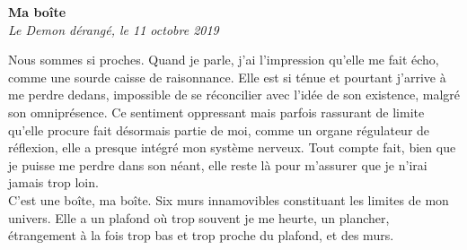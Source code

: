 \documentclass[french,12pt,amstex,a4paper]{article}
\begin{document}
\begin{center}
{\bf Ma boîte}\\
{\it Le Demon dérangé, le 11 octobre 2019}\\
\end{center}

Nous sommes si proches. Quand je parle, j'ai l'impression qu'elle me fait écho, comme une sourde caisse de raisonnance. Elle est si ténue et pourtant j'arrive à me perdre dedans, impossible de se réconcilier avec l'idée de son existence, malgré son omniprésence. Ce sentiment oppressant mais parfois rassurant de limite qu'elle procure fait désormais partie de moi, comme un organe régulateur de réflexion, elle a presque intégré mon système nerveux. Tout compte fait, bien que je puisse me perdre dans son néant, elle reste là pour m'assurer que je n'irai jamais trop loin.\\

C'est une boîte, ma boîte. Six murs innamovibles constituant les limites de mon univers. Elle a un plafond où trop souvent je me heurte, un plancher, étrangement à la fois trop bas et trop proche du plafond, et des murs.
\end{document}
